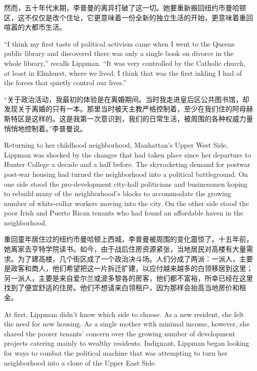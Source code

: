 \ifdefined\chs
然而，五十年代末期，李普曼的离异打破了这一切。她要重新搬回纽约市曼哈顿区，这不仅仅是改个住址，它更意味着一份全新的独立生活的开始，更意味着重回喧嚣的大都市生活。
\fi

\ifdefined\eng
``I think my first taste of political activism came when I went to the Queens public library and discovered there was only a single book on divorce in the whole library,'' recalls Lippman. ``It was very controlled by the Catholic church, at least in Elmhurst, where we lived. I think that was the first inkling I had of the forces that quietly control our lives.''
\fi

\ifdefined\chs
``关于政治活动，我最初的体验是在离婚期间。当时我走进皇后区公共图书馆，却发现关于离婚的只有一本。那里当时被天主教严格控制着，至少在我们住的阿母赫斯特区是这样的。这是我第一次意识到，我们的日常生活，被周围的各种权威力量悄悄地控制着。''李普曼说。
\fi

\ifdefined\eng
Returning to her childhood neighborhood, Manhattan's Upper West Side, Lippman was shocked by the changes that had taken place since her departure to Hunter College a decade and a half before. The skyrocketing demand for \ifdefined\vone postwar \fi\ifdefined\vtwo post-war \fi housing had turned the neighborhood into a political battleground. On one side stood the pro-development city-hall politicians and businessmen hoping to rebuild many of the neighborhood's blocks to accommodate the growing number of white-collar workers moving into the city. On the other side stood the poor Irish and Puerto Rican tenants who had found an affordable haven in the neighborhood.
\fi

\ifdefined\chs
重回童年居住过的纽约市曼哈顿上西城，李普曼被周围的变化震惊了。十五年前，她离家去亨特学院读书。如今，由于战后住房资源紧张，当地居民对高楼有大量需求。为了建高楼，几个街区成了一个政治决斗场。人们分成了两派：一派人，主要是政客和商人，他们希望把这一片拆迁扩建，以应付越来越多的白领移居到这里；另一派人，主要是来自爱尔兰或波多黎各的房客，他们都不富裕，所幸已经在这里找到了便宜舒适的住房。他们不想请来白领租户，因为那样会抬高当地房价和租金。
\fi

\ifdefined\eng
At first, Lippman didn't know which side to choose. As a new resident, she felt the need for new housing. As a single mother with minimal income, however, she shared the poorer tenants' concern over the growing number of development projects catering mainly to wealthy residents. Indignant, Lippman began looking for ways to combat the political machine that was attempting to turn her neighborhood into a clone of the Upper East Side.
\fi

